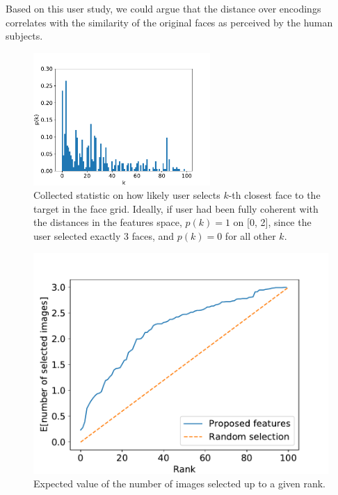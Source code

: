 Based on this user study, we could argue that the distance over encodings correlates with the similarity of the original faces as perceived by the human subjects.

\begin{figure}
    \centering
    \includegraphics[width=0.6\textwidth]{graphs/survey_distribution_without_the_easy.pdf}
    
    \caption{Collected statistic on how likely user selects $k$-th closest face to the target in the face grid. Ideally, if user had been fully coherent with the distances in the features space, $p(k) = 1$ on [0, 2], since the user selected exactly 3 faces, and $p(k) = 0$ for all other $k$.}
    \label{fig:survey_distribution}
\end{figure}


\begin{figure}
    \centering
    \includegraphics[width=0.8\linewidth]{graphs/survey_cumsum_without_the_easy.pdf}
    \caption{Expected value of the number of images selected up to a given rank.}
    \label{fig:random_selection_faces}
\end{figure}

